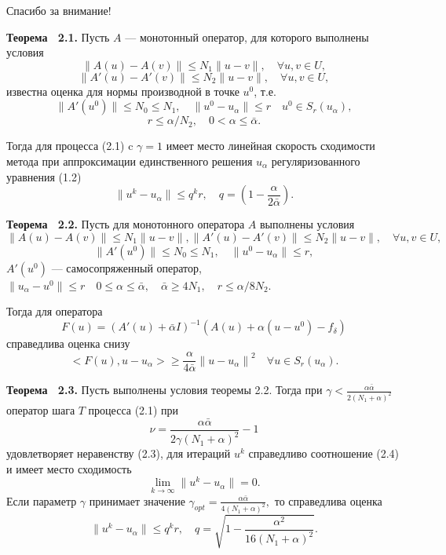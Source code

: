 \documentclass[10pt,pdf, mathserif, hyperref={unicode}]{beamer}
\begin{document}
\begin{frame}\label{lastpage}
	\Huge{\centerline{Спасибо за внимание!}}
\end{frame}
\begin{frame}
	\begin{block}{\bf Теорема ~2.1.} 
		Пусть $A$ --- монотонный оператор, для которого выполнены условия 
		$$\|A(u)-A(v)\|\le N_1\|u-v\|, \quad \forall u, v \in U,$$ 
		$$\|A'(u)-A'(v)\|\le N_2\|u-v\|, \quad \forall u, v \in U,$$
		известна оценка для нормы производной в точке $u^0$, т.е.
		$$	\|A'(u^0)\| \le N_0\le N_1, \quad \|u^0-u_\alpha\| \le r \quad
		u^0 \in S_r(u_\alpha),$$ $$r\le \alpha/N_2, \quad 0<\alpha \le \bar\alpha.$$ 
		
		\smallskip
		Тогда для процесса (2.1) c $\gamma=1$ имеет место линейная скорость сходимости метода при аппроксимации единственного решения $u_\alpha$ регуляризованного уравнения (1.2)
		$$\| u^{k}-u_\alpha \| \le q^kr, \quad q=(1-\frac{\alpha}{2\bar\alpha}).$$
	\end{block}
\end{frame}
\begin{frame}
	\begin{block}{\bf Теорема ~2.2.}
		Пусть для монотонного оператора $A$ выполнены условия $$
		\|A(u)-A(v)\|\le N_1\|u-v\|,
		\|A'(u)-A'(v)\|\le N_2\|u-v\|, \quad \forall u, v \in U,$$
		$$\|A'(u^0)\| \le N_0\le N_1, \quad \|u^0-u_\alpha\| \le r, $$
		\smallskip
		$A'(u^0)$ --- самосопряженный оператор, $\|u_\alpha-u^0\|\le r \quad  
		0\le\alpha\le\bar\alpha,\quad\bar\alpha\ge 4N_1,\quad r\le\alpha/8N_2.$
		\vspace{3mm}
		
		Тогда для оператора
		$$ F(u)=(A'(u)+\bar\alpha I)^{-1}(A(u)+\alpha(u-u^0)-f_\delta) $$
		справедлива оценка снизу
		$$<F(u), u-u_\alpha>\ge\frac{\alpha}{4\bar\alpha}{\|u-u_\alpha\|}^2 \quad \forall u \in S_r(u_\alpha).$$
	\end{block}
\end{frame} 
\begin{frame}
	\begin{block}{\bf Теорема ~2.3.}
		Пусть выполнены условия теоремы 2.2. Тогда при
		$\gamma<\frac{\alpha\bar\alpha}{2(N_1+\alpha)^2}$
		оператор шага $T$ процесса (2.1) при
		$$\nu=\frac{\alpha\bar\alpha}{2\gamma(N_1+\alpha)^2}-1$$
		удовлетворяет неравенству (2.3), для итераций $u^k$ справедливо соотношение (2.4) и имеет место сходимость
		$$\lim_{k\to\infty}\|u^k-u_\alpha\|=0.$$
		Если параметр $\gamma$ принимает значение ${\gamma}_{opt}=\frac{\alpha\bar\alpha}{4(N_1+\alpha)^2},$ то справедлива оценка $$\|u^k-u_\alpha\|\le q^k r, \quad q=\sqrt{1-\frac{{\alpha}^2}  {16(N_1+\alpha)^2}}.$$
	\end{block}
\end{frame}
\end{document}
